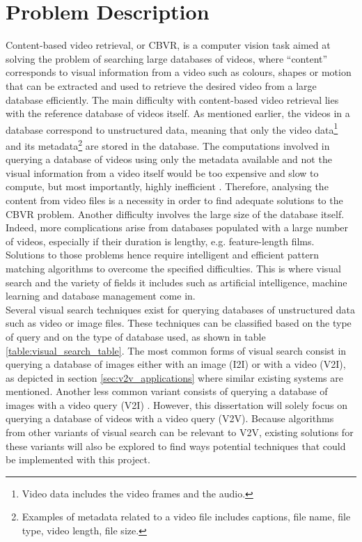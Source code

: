 
\section{Problem Description}
\label{sec:problem-description}

Content-based video retrieval, or CBVR, is a computer vision task aimed at solving the problem of searching large databases of videos, where ``content'' corresponds to visual information from a video such as colours, shapes or motion that can be extracted and used to retrieve the desired video from a large database efficiently. The main difficulty with content-based video retrieval lies with the reference database of videos itself. As mentioned earlier, the videos in a database correspond to unstructured data, meaning that only the video data\footnote{Video data includes the video frames and the audio.} and its metadata\footnote{Examples of metadata related to a video file includes captions, file name, file type, video length, file size.} are stored in the database. The computations involved in querying a database of videos using only the metadata available and not the visual information from a video itself would be too expensive and slow to compute, but most importantly, highly inefficient \cite{patel2012}. Therefore, analysing the content from video files is a necessity in order to find adequate solutions to the CBVR problem. Another difficulty involves the large size of the database itself. Indeed, more complications arise from databases populated with a large number of videos, especially if their duration is lengthy, e.g. feature-length films. Solutions to those problems hence require intelligent and efficient pattern matching algorithms to overcome the specified difficulties. This is where visual search and the variety of fields it includes such as artificial intelligence, machine learning and database management come in.\\

Several visual search techniques exist for querying databases of unstructured data such as video or image files. These techniques can be classified based on the type of query and on the type of database used, as shown in table \ref{table:visual_search_table}. The most common forms of visual search consist in querying a database of images either with an image (I2I) or with a video (V2I), as depicted in section \ref{sec:v2v_applications} where similar existing systems are mentioned. Another less common variant consists of querying a database of images with a video query (V2I) \cite{araujo2017i2v}. However, this dissertation will solely focus on querying a database of videos with a video query (V2V). Because algorithms from other variants of visual search can be relevant to V2V, existing solutions for these variants will also be explored to find ways potential techniques that could be implemented with this project.\\

